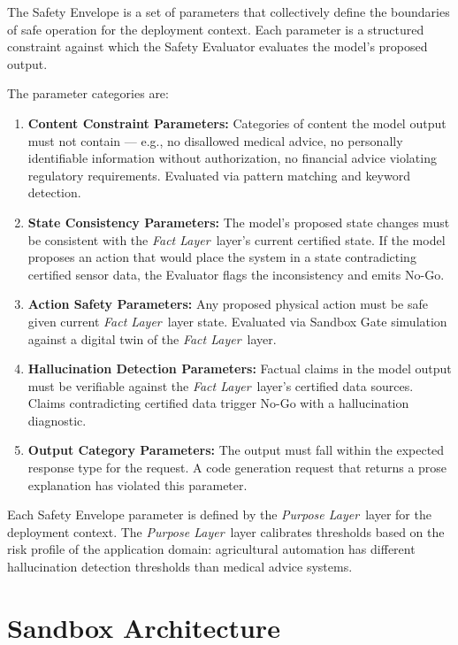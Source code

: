 \documentclass[12pt]{article}
\newcommand{\purpose}{\textit{Purpose Layer}}
\newcommand{\fact}{\textit{Fact Layer}}
\begin{document}
The Safety Envelope is a set of parameters that collectively define the boundaries of safe operation for the deployment context. Each parameter is a structured constraint against which the Safety Evaluator evaluates the model's proposed output.

The parameter categories are:

\begin{enumerate}
    \item \textbf{Content Constraint Parameters:} Categories of content the model output must not contain — e.g., no disallowed medical advice, no personally identifiable information without authorization, no financial advice violating regulatory requirements. Evaluated via pattern matching and keyword detection.
    \item \textbf{State Consistency Parameters:} The model's proposed state changes must be consistent with the \fact\ layer's current certified state. If the model proposes an action that would place the system in a state contradicting certified sensor data, the Evaluator flags the inconsistency and emits No-Go.
    \item \textbf{Action Safety Parameters:} Any proposed physical action must be safe given current \fact\ layer state. Evaluated via Sandbox Gate simulation against a digital twin of the \fact\ layer.
    \item \textbf{Hallucination Detection Parameters:} Factual claims in the model output must be verifiable against the \fact\ layer's certified data sources. Claims contradicting certified data trigger No-Go with a hallucination diagnostic.
    \item \textbf{Output Category Parameters:} The output must fall within the expected response type for the request. A code generation request that returns a prose explanation has violated this parameter.
\end{enumerate}

Each Safety Envelope parameter is defined by the \purpose\ layer for the deployment context. The \purpose\ layer calibrates thresholds based on the risk profile of the application domain: agricultural automation has different hallucination detection thresholds than medical advice systems.

\section{Sandbox Architecture}
\label{sec:architecture}
\end{document}
